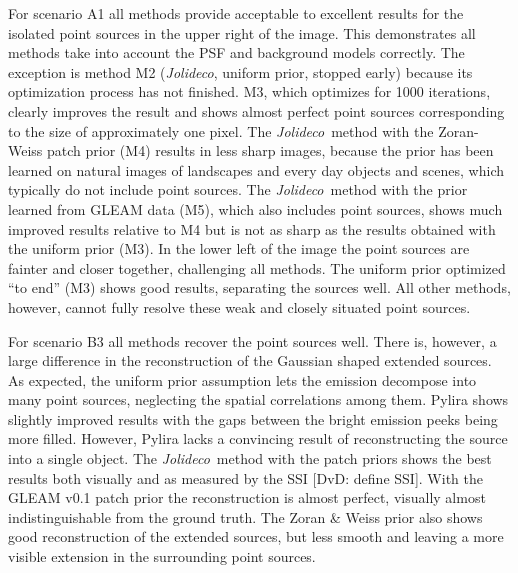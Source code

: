 \documentclass[twocolumn]{aastex631}
\newcommand{\jolideco}{\textit{Jolideco}~}
\newcommand{\jolideconospace}{\textit{Jolideco}}
\newcommand{\dvd}[1]{{\color{red} [DvD: #1]}}
\begin{document}
    For scenario A1 all methods provide acceptable to excellent results for the isolated point sources in the upper right of the image. This demonstrates all methods take into account the PSF and background models correctly. The exception is method M2 (\jolideconospace, uniform prior, stopped early) 
    because its optimization process has not finished. M3, which optimizes for 1000 iterations, clearly improves the result and shows almost perfect point sources corresponding to the size of approximately one pixel. The \jolideco method with the Zoran-Weiss  patch prior (M4) results in less sharp images, because the prior has been learned on natural images of landscapes and every day objects and scenes, which typically do not include point sources. The \jolideco method with the prior learned from GLEAM data (M5), which also includes point sources, shows much improved results relative to M4 but is not as sharp as the results obtained with the uniform prior (M3). In the lower left of the image the point sources are fainter and closer together, challenging all methods. The uniform prior optimized \enquote{to end} (M3) shows good results, separating the sources well. All other methods, however, cannot fully resolve these weak and closely situated point sources.
    
    For scenario B3 all methods recover the point sources well.  There is, however, a large difference  in the reconstruction of the Gaussian shaped extended sources. As expected, the uniform prior assumption lets the emission decompose into many point sources, neglecting the spatial correlations among them. Pylira shows slightly improved results with the gaps between the bright emission peeks being more filled. However, Pylira lacks a convincing result of reconstructing the source into a single object. The \jolideco method with the patch priors shows the best results both visually and as measured by the SSI \dvd{define SSI}. With the GLEAM v0.1 patch prior the reconstruction is almost perfect, visually almost indistinguishable from the ground truth. The Zoran \& Weiss prior also shows good reconstruction of the extended sources, but less smooth and leaving a more visible extension in the surrounding point sources.
 
\end{document}
